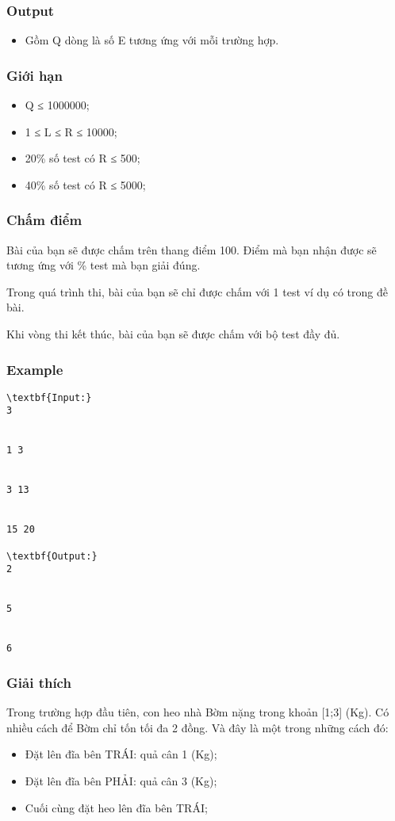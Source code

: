 \subsubsection{   Output  }
\begin{itemize}
	\item     Gồm Q dòng là số E tương ứng với mỗi trường hợp.   
\end{itemize}

\subsubsection{   Giới hạn  }
\begin{itemize}
	\item     Q ≤ 1000000;   
	\item     1 ≤ L ≤ R ≤ 10000;   
	\item     20\% số test có R ≤ 500;   
	\item     40\% số test có R ≤ 5000;   
\end{itemize}

\subsubsection{   Chấm điểm  }

   Bài của bạn sẽ được chấm trên thang điểm 100. Điểm mà bạn nhận được sẽ tương ứng với \% test mà bạn giải đúng.  

   Trong quá trình thi, bài của bạn sẽ chỉ được chấm với 1 test ví dụ có trong đề bài.  

   Khi vòng thi kết thúc, bài của bạn sẽ được chấm với bộ test đầy đủ.  

\subsubsection{   Example  }
\begin{verbatim}
\textbf{Input:}
3


1 3


3 13


15 20

\textbf{Output:}
2


5


6\end{verbatim}

\subsubsection{   Giải thích  }

   Trong trường hợp đầu tiên, con heo nhà Bờm nặng trong khoản [1;3] (Kg). Có nhiều cách để Bờm chỉ tốn tối đa 2 đồng. Và đây là một trong những cách đó:  
\begin{itemize}
	\item     Đặt lên đĩa bên TRÁI: quả cân 1 (Kg);   
	\item     Đặt lên đĩa bên PHẢI: quả cân 3 (Kg);   
	\item     Cuối cùng đặt heo lên đĩa bên TRÁI;   
\end{itemize}

